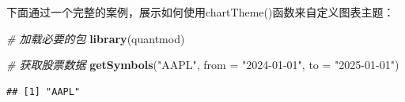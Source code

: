 \documentclass[]{ctexbook}
\newenvironment{Shaded}{\begin{snugshade}}{\end{snugshade}}
\newcommand{\AttributeTok}[1]{\textcolor[rgb]{0.13,0.29,0.53}{#1}}
\newcommand{\CommentTok}[1]{\textcolor[rgb]{0.56,0.35,0.01}{\textit{#1}}}
\newcommand{\FunctionTok}[1]{\textcolor[rgb]{0.13,0.29,0.53}{\textbf{#1}}}
\newcommand{\NormalTok}[1]{#1}
\newcommand{\StringTok}[1]{\textcolor[rgb]{0.31,0.60,0.02}{#1}}
\begin{document}
下面通过一个完整的案例，展示如何使用chartTheme()函数来自定义图表主题：

\begin{Shaded}
\begin{Highlighting}[]
\CommentTok{\# 加载必要的包}
\FunctionTok{library}\NormalTok{(quantmod)}

\CommentTok{\# 获取股票数据}
\FunctionTok{getSymbols}\NormalTok{(}\StringTok{"AAPL"}\NormalTok{, }\AttributeTok{from =} \StringTok{"2024{-}01{-}01"}\NormalTok{, }\AttributeTok{to =} \StringTok{"2025{-}01{-}01"}\NormalTok{)}
\end{Highlighting}
\end{Shaded}

\begin{verbatim}
## [1] "AAPL"
\end{verbatim}
\end{document}
